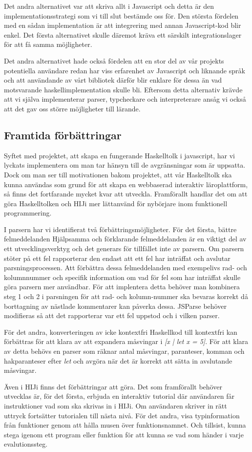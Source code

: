 Det andra alternativet var att skriva allt i Javascript och detta är den
implementationsstrategi som vi till slut bestämde oss för. Den största
fördelen med en sådan implementation är att integrering med annan
Javascript-kod blir enkel. Det första alternativet skulle däremot kräva ett
särskilt integrationslager för att få samma möjligheter.

Det andra alternativet hade också fördelen att en stor del av vår projekts potentiella användare redan har viss erfarenhet av Javascript och liknande språk och att användande av vårt bibliotek därför blir enklare för dessa än vad motsvarande haskellimplementation skulle bli. Eftersom detta alternativ krävde att vi själva implementerar parser, typcheckare och interpreterare ansåg vi också att det gav oss större möjligheter till lärande. 

\subsection{Framtida förbättringar}

Syftet med projektet, att skapa en fungerande Haskelltolk i javascript, har vi lyckats implementera om man tar hänsyn till de avgränsningar som är uppsatta. Dock om man ser till motivationen bakom projektet, att vår Haskelltolk ska kunna användas som grund för att skapa en webbaserad interaktiv läroplattform, så finns det fortfarande mycket kvar att utveckla. Framförallt handlar det om att göra Haskelltolken och HIJi mer lättanvänd för nybörjare inom funktionell programmering.

I parsern har vi identifierat två förbättringsmöjligheter. För det första, bättre felmeddelanden
Hjälpsamma och förklarande felmeddelanden är en viktigt del av ett utvecklingsverktyg och det generars för tillfället inte av parsern. 
Om parsern stöter på ett fel rapporterar den endast att ett fel har inträffat och avslutar parsningsprocessen. 
Att förbättra dessa felmeddelanden med exempelivs rad- och kolumnnummer och specifik information om vad för fel som har inträffat skulle göra parsern mer användbar.
För att implentera detta behöver man kombinera steg 1 och 2 i parsningen för att rad- och kolumn-nummer ska bevaras korrekt då borttagning av nästlade kommentarer kan påverka dessa.
JSParse behöver modifieras så att det rapporterar var ett fel uppstod och i vilken parser.

För det andra, konverteringen av icke kontextfri Haskellkod till kontextfri kan förbättras 
för att klara av att expandera måsvingar i \emph{[x | let x = 5]}. 
För att klara av detta behövs en parser som räknar antal måsvingar, paranteser, 
komman och hakparanteser efter \emph{let} och avgöra när det är korrekt att sätta in avslutande måsvingar.

Även i HIJi finns det förbättringar att göra.
Det som framförallt behöver utvecklas är, för det första, erbjuda en interaktiv tutorial där användaren får instruktioner vad som ska skrivas in i HIJi. Om användaren skriver in rätt uttryck fortsätter tutorialen till nästa nivå.
För det andra, visa typinformation från funktioner genom att hålla musen över funktionsnamnet.
Och tillsist, kunna stega igenom ett program eller funktion för att kunna se vad som händer i varje evalutionssteg. 
